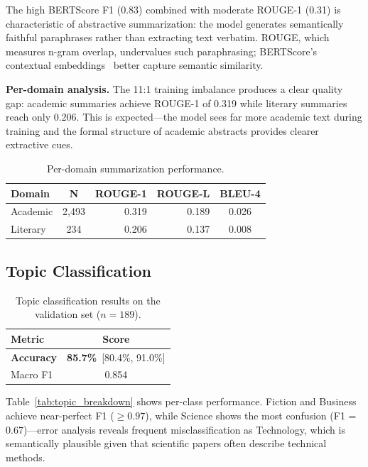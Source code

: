 \documentclass[11pt,a4paper]{article}
\begin{document}
The high BERTScore F1 (0.83) combined with moderate ROUGE-1 (0.31) is characteristic of abstractive summarization: the model generates semantically faithful paraphrases rather than extracting text verbatim.
ROUGE, which measures n-gram overlap, undervalues such paraphrasing; BERTScore's contextual embeddings~\citep{zhang2019bertscore} better capture semantic similarity.

\textbf{Per-domain analysis.}
The 11:1 training imbalance produces a clear quality gap: academic summaries achieve ROUGE-1 of 0.319 while literary summaries reach only 0.206.
This is expected---the model sees far more academic text during training and the formal structure of academic abstracts provides clearer extractive cues.

\begin{table}[t]
\centering
\caption{Per-domain summarization performance.}
\label{tab:domain_breakdown}
\begin{tabular}{@{}lcrrc@{}}
\toprule
\textbf{Domain} & \textbf{N} & \textbf{ROUGE-1} & \textbf{ROUGE-L} & \textbf{BLEU-4} \\
\midrule
Academic & 2{,}493 & 0.319 & 0.189 & 0.026 \\
Literary & 234 & 0.206 & 0.137 & 0.008 \\
\bottomrule
\end{tabular}
\end{table}

\subsection{Topic Classification}

\begin{table}[t]
\centering
\caption{Topic classification results on the validation set ($n = 189$).}
\label{tab:topic_results}
\begin{tabular}{lc}
\toprule
\textbf{Metric} & \textbf{Score} \\
\midrule
\textbf{Accuracy} & \textbf{85.7\%}~{\scriptsize[80.4\%, 91.0\%]} \\
Macro F1 & 0.854 \\
\bottomrule
\end{tabular}
\end{table}

Table~\ref{tab:topic_breakdown} shows per-class performance.
Fiction and Business achieve near-perfect F1 ($\geq 0.97$), while Science shows the most confusion (F1 = 0.67)---error analysis reveals frequent misclassification as Technology, which is semantically plausible given that scientific papers often describe technical methods.
\end{document}
